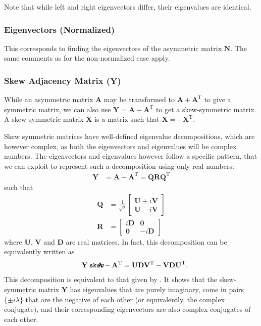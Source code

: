 \documentclass{article}
\def\mathnote#1{%
  \tag*{\rlap{\hspace\marginparsep\smash{\parbox[t]{\marginparwidth}{#1}}}}
}
\begin{document}
Note that while left and right eigenvectors differ, their eigenvalues
are identical. 

\subsubsection{Eigenvectors (Normalized)}
This corresponds to finding the eigenvectors of the asymmetric matrix
$\mathbf N$. 
The same comments as for the non-normalized case apply. 

\subsubsection{Skew Adjacency Matrix ($\mathbf Y$)}
While an asymmetric matrix $\mathbf A$ may be transformed to $\mathbf A
+ \mathbf A^{\mathrm T}$ to give a symmetric matrix, we can also use
$\mathbf Y = \mathbf A - \mathbf A^{\mathrm T}$ to get a skew-symmetric matrix.  A
skew symmetric matrix $\mathbf X$ is a matrix such that $\mathbf X =
-\mathbf X^{\mathrm T}$.

Skew symmetric matrices have well-defined eigenvalue decompositions,
which are however complex, as both the eigenvectors and eigenvalues will
be complex numbers.  The eigenvectors and eigenvalues however follow a
specific pattern, that we can exploit to represent such a decomposition
using only real numbers:
\begin{align}
  \mathbf Y &= \mathbf A - \mathbf A^{\mathrm T} = \mathbf Q \mathbf R \mathbf Q^{\mathrm T}
\end{align}
such that
\begin{align}
  \mathbf Q &= \frac 1 {\sqrt{2}} \left[
    \begin{array}{cc}
      \mathbf U + i \mathbf V \\
      \mathbf U - i \mathbf V 
    \end{array}
    \right] \\
  \mathbf R &= \left[ \begin{array}{cc}
      i \mathbf D & \mathbf 0 \\
      \mathbf 0 & -i \mathbf D
    \end{array} \right]
\end{align}
where $\mathbf U$, $\mathbf V$ and $\mathbf D$ are real matrices.  In
fact, this decomposition can be equivalently written as
\begin{align}
  \mathnote{\texttt{skew}}
  \mathbf Y = \mathbf A - \mathbf A^{\mathrm T} &=
  \mathbf U \mathbf D \mathbf V^{\mathrm T} - \mathbf V \mathbf D \mathbf U^{\mathrm T}.
\end{align}
This decomposition is equivalent to that given by 
\cite{b869}.  It shows that the skew-symmetric matrix $\mathbf Y$ has
eigenvalues that are purely imaginary, come  
in pairs $\{\pm i \lambda\}$ that are the negative of each other (or
equivalently, the complex conjugate), and their corresponding
eigenvectors are also complex conjugates of each other.
\end{document}
